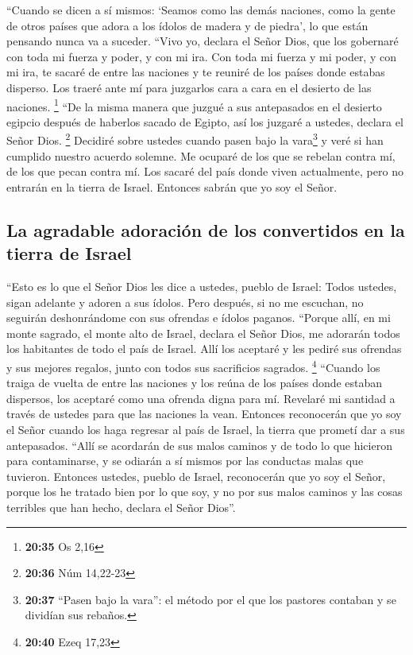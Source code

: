  ``Cuando se dicen a sí mismos: `Seamos como las demás
naciones, como la gente de otros países que adora a los ídolos de madera
y de piedra', lo que están pensando nunca va a suceder. 
``Vivo yo, declara el Señor Dios, que los gobernaré con toda mi fuerza y
poder, y con mi ira.  Con toda mi fuerza y mi poder, y
con mi ira, te sacaré de entre las naciones y te reuniré de los países
donde estabas disperso.  Los traeré ante mí para
juzgarlos cara a cara en el desierto de las naciones. \footnote{\textbf{20:35}
  Os 2,16}  ``De la misma manera que juzgué a sus
antepasados en el desierto egipcio después de haberlos sacado de Egipto,
así los juzgaré a ustedes, declara el Señor Dios. \footnote{\textbf{20:36}
  Núm 14,22-23}  Decidiré sobre ustedes cuando pasen bajo
la vara\footnote{\textbf{20:37} ``Pasen bajo la vara'': el método por el
  que los pastores contaban y se dividían sus rebaños.} y veré si han
cumplido nuestro acuerdo solemne.  Me ocuparé de los que
se rebelan contra mí, de los que pecan contra mí. Los sacaré del país
donde viven actualmente, pero no entrarán en la tierra de Israel.
Entonces sabrán que yo soy el Señor.

\hypertarget{la-agradable-adoraciuxf3n-de-los-convertidos-en-la-tierra-de-israel}{%
\subsection{La agradable adoración de los convertidos en la tierra de
Israel}\label{la-agradable-adoraciuxf3n-de-los-convertidos-en-la-tierra-de-israel}}

 ``Esto es lo que el Señor Dios les dice a ustedes,
pueblo de Israel: Todos ustedes, sigan adelante y adoren a sus ídolos.
Pero después, si no me escuchan, no seguirán deshonrándome con sus
ofrendas e ídolos paganos.  ``Porque allí, en mi monte
sagrado, el monte alto de Israel, declara el Señor Dios, me adorarán
todos los habitantes de todo el país de Israel. Allí los aceptaré y les
pediré sus ofrendas y sus mejores regalos, junto con todos sus
sacrificios sagrados. \footnote{\textbf{20:40} Ezeq 17,23}
 ``Cuando los traiga de vuelta de entre las naciones y
los reúna de los países donde estaban dispersos, los aceptaré como una
ofrenda digna para mí. Revelaré mi santidad a través de ustedes para que
las naciones la vean.  Entonces reconocerán que yo soy el
Señor cuando los haga regresar al país de Israel, la tierra que prometí
dar a sus antepasados.  ``Allí se acordarán de sus malos
caminos y de todo lo que hicieron para contaminarse, y se odiarán a sí
mismos por las conductas malas que tuvieron.  Entonces
ustedes, pueblo de Israel, reconocerán que yo soy el Señor, porque los
he tratado bien por lo que soy, y no por sus malos caminos y las cosas
terribles que han hecho, declara el Señor Dios''.

